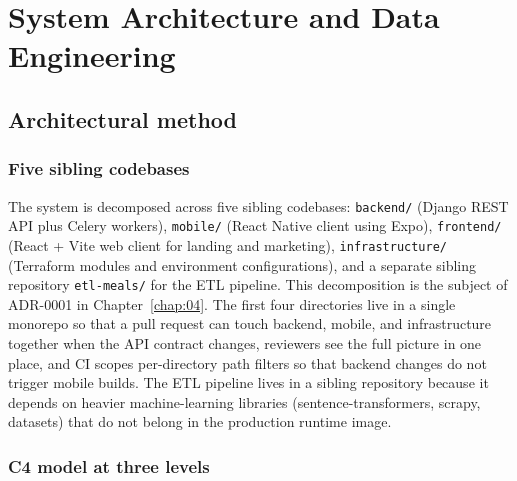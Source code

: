%
%
\chapter{System Architecture and Data Engineering}
\label{chap:02}
\setlength{\parskip}{1em}

\section{Architectural method}

\subsection{Five sibling codebases}

The system is decomposed across five sibling codebases: \texttt{backend/} (Django REST API plus Celery workers), \texttt{mobile/} (React Native client using Expo), \texttt{frontend/} (React + Vite web client for landing and marketing), \texttt{infrastructure/} (Terraform modules and environment configurations), and a separate sibling repository \texttt{etl-meals/} for the ETL pipeline. This decomposition is the subject of ADR-0001 in Chapter~\ref{chap:04}. The first four directories live in a single monorepo so that a pull request can touch backend, mobile, and infrastructure together when the API contract changes, reviewers see the full picture in one place, and CI scopes per-directory path filters so that backend changes do not trigger mobile builds. The ETL pipeline lives in a sibling repository because it depends on heavier machine-learning libraries (sentence-transformers, scrapy, datasets) that do not belong in the production runtime image.

\subsection{C4 model at three levels}

